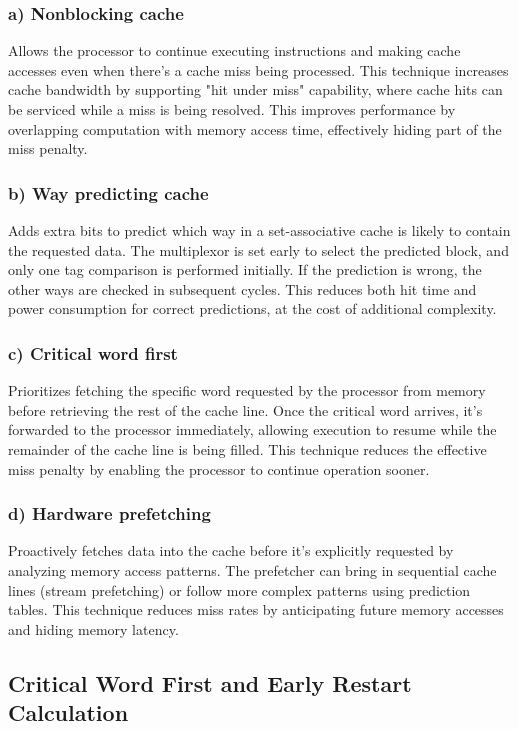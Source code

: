\documentclass[12pt]{article}
\begin{document}
\subsubsection*{a) Nonblocking cache}
Allows the processor to continue executing instructions and making cache accesses even when there's a cache miss being processed. This technique increases cache bandwidth by supporting "hit under miss" capability, where cache hits can be serviced while a miss is being resolved. This improves performance by overlapping computation with memory access time, effectively hiding part of the miss penalty.

\subsubsection*{b) Way predicting cache}
Adds extra bits to predict which way in a set-associative cache is likely to contain the requested data. The multiplexor is set early to select the predicted block, and only one tag comparison is performed initially. If the prediction is wrong, the other ways are checked in subsequent cycles. This reduces both hit time and power consumption for correct predictions, at the cost of additional complexity.

\subsubsection*{c) Critical word first}
Prioritizes fetching the specific word requested by the processor from memory before retrieving the rest of the cache line. Once the critical word arrives, it's forwarded to the processor immediately, allowing execution to resume while the remainder of the cache line is being filled. This technique reduces the effective miss penalty by enabling the processor to continue operation sooner.

\subsubsection*{d) Hardware prefetching}
Proactively fetches data into the cache before it's explicitly requested by analyzing memory access patterns. The prefetcher can bring in sequential cache lines (stream prefetching) or follow more complex patterns using prediction tables. This technique reduces miss rates by anticipating future memory accesses and hiding memory latency.

\subsection*{Critical Word First and Early Restart Calculation}
\end{document}
